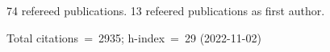 74 refereed publications. 13 refeered publications as first author.

Total citations~=~2935; h-index~=~29 (2022-11-02)